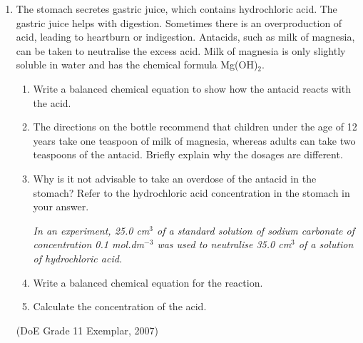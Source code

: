 \begin{eocexercises}{}
\begin{enumerate}
\begin{enumerate}
(IEB Paper 2, 2005)

	\item{
When chlorine water (Cl$_{2}$ dissolved in water) is added to a solution of potassium bromide, bromine is produced. Which one of the following statements concerning this reaction is correct?
		\begin{enumerate}
		\item{Br$^{-}$ is oxidised}
		\item{Cl$_{2}$ is oxidised}
		\item{Br$^{-}$ is the oxidising agent}
		\item{Cl$^{-}$ is the oxidising agent}
		\end{enumerate}
}
(IEB Paper 2, 2005)
	\end{enumerate}
\renewcommand{\labelenumii}{\alph{enumii}}

\item{
The stomach secretes gastric juice, which contains hydrochloric acid. The gastric juice helps with digestion. Sometimes there is an overproduction of acid, leading to heartburn or indigestion. Antacids, such as milk of magnesia, can be taken to neutralise the excess acid. Milk of magnesia is only slightly soluble in water and has the chemical formula Mg(OH)$_{2}$.
	\begin{enumerate}
	\item{Write a balanced chemical equation to show how the antacid reacts with the acid.}
	\item{The directions on the bottle recommend that children under the age of 12 years take one teaspoon of milk of magnesia, whereas adults can take two teaspoons of the antacid. Briefly explain why the dosages are different.}
	\item{Why is it not advisable to take an overdose of the antacid in the stomach? Refer to the hydrochloric acid concentration in the stomach in your answer.}

\textit{In an experiment, 25.0 cm$^{3}$ of a standard solution of sodium carbonate of concentration 0.1 mol.dm$^{-3}$ was used to neutralise 35.0 cm$^{3}$ of a solution of hydrochloric acid.}

	\item{Write a balanced chemical equation for the reaction.}
	\item{Calculate the concentration of the acid.} 
	\end{enumerate}
}
(DoE Grade 11 Exemplar, 2007)
\end{enumerate}

\practiceinfo
\end{eocexercises}



